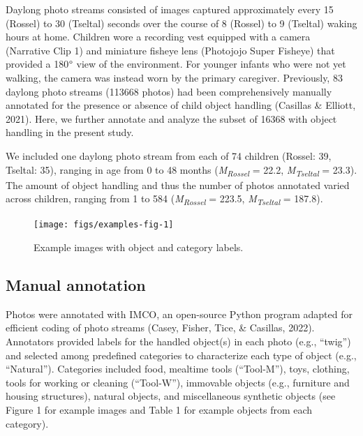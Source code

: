 \documentclass[10pt, letterpaper]{article}
\newenvironment{CodeChunk}{}{}
\begin{document}
Daylong photo streams consisted of images captured approximately every
15 (Rossel) to 30 (Tseltal) seconds over the course of 8 (Rossel) to 9
(Tseltal) waking hours at home. Children wore a recording vest equipped
with a camera (Narrative Clip 1) and miniature fisheye lens (Photojojo
Super Fisheye) that provided a 180\(\text{\textdegree}\) view of the
environment. For younger infants who were not yet walking, the camera
was instead worn by the primary caregiver. Previously, 83 daylong photo
streams (113668 photos) had been comprehensively manually annotated for
the presence or absence of child object handling (Casillas \& Elliott,
2021). Here, we further annotate and analyze the subset of 16368 with
object handling in the present study.

We included one daylong photo stream from each of 74 children (Rossel:
39, Tseltal: 35), ranging in age from 0 to 48 months
(\emph{M}\textsubscript{\emph{Rossel}} = 22.2,
\emph{M}\textsubscript{\emph{Tseltal}} = 23.3). The amount of object
handling and thus the number of photos annotated varied across children,
ranging from 1 to 584 (\emph{M}\textsubscript{\emph{Rossel}} = 223.5,
\emph{M}\textsubscript{\emph{Tseltal}} = 187.8).

\begin{CodeChunk}
\begin{figure}[h]

{\centering \texttt{[image: figs/examples-fig-1]} 

}

\caption[Example images with object and category labels]{Example images with object and category labels.}\label{fig:examples-fig}
\end{figure}
\end{CodeChunk}

\hypertarget{manual-annotation}{%
\subsection{Manual annotation}\label{manual-annotation}}

Photos were annotated with IMCO, an open-source Python program adapted
for efficient coding of photo streams (Casey, Fisher, Tice, \& Casillas,
2022). Annotators provided labels for the handled object(s) in each
photo (e.g., ``twig'') and selected among predefined categories to
characterize each type of object (e.g., ``Natural''). Categories
included food, mealtime tools (``Tool-M''), toys, clothing, tools for
working or cleaning (``Tool-W''), immovable objects (e.g., furniture and
housing structures), natural objects, and miscellaneous synthetic
objects (see Figure 1 for example images and Table 1 for example objects
from each category).
\end{document}
